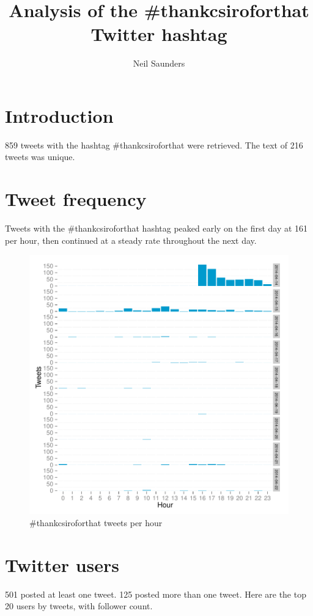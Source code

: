 \documentclass[a4paper,10pt]{article}
\title{Analysis of the \#thankcsiroforthat Twitter hashtag}
\author{Neil Saunders}
\begin{document}

\maketitle

\section{Introduction}

859 tweets with the hashtag \#thankcsiroforthat were retrieved. The text of 216 tweets was unique.

\section{Tweet frequency}
Tweets with the \#thankcsiroforthat hashtag peaked early on the first day at 161 per hour, then continued at a steady rate throughout the next day.

\begin{figure}[h]
\begin{center}
\includegraphics{thankCSIROjson-002}
\caption{\#thankcsiroforthat tweets per hour}
\end{center}
\end{figure}

\newpage

\section{Twitter users}
501 posted at least one tweet. 125 posted more than one tweet. Here are the top 20 users by tweets, with follower count.
\end{document}
